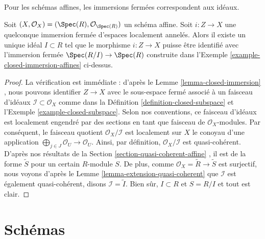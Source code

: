 \begin{lemma}
\label{lemma-closed-immersion-affine-case}
\begin{slogan}
Pour les schémas affines, les immersions fermées correspondent aux idéaux.
\end{slogan}
Soit  $(X, \mathcal{O}_X) = (\Spec(R), \mathcal{O}_{\Spec(R)})$  un schéma affine. Soit  $i : Z \to X$  une quelconque immersion
fermée d'espaces localement annelés. Alors il existe un unique idéal  $I \subset R$ 
tel que le morphisme  $i : Z \to X$  puisse être identifié avec l'immersion fermée
 $\Spec(R/I) \to \Spec(R)$  construite dans l'Exemple  \ref{example-closed-immersion-affines}  ci-dessus.
\end{lemma}

\begin{proof}
La vérification est immédiate : d'après le Lemme  \ref{lemma-closed-immersion} , nous pouvons
identifier  $Z \to X$  avec le sous-espace fermé associé à un faisceau d'idéaux
 $\mathcal{I} \subset \mathcal{O}_X$  comme dans la Définition  \ref{definition-closed-subspace}  et l'Exemple  \ref{example-closed-subspace}.
Selon nos conventions, ce faisceau d'idéaux est localement engendré par des
sections en tant que faisceau de  $\mathcal{O}_X$-modules. Par conséquent, le faisceau
quotient  $\mathcal{O}_X / \mathcal{I}$  est localement sur  $X$  le conoyau d'une application
 $\bigoplus_{j \in J} \mathcal{O}_U \to \mathcal{O}_U$. Ainsi, par définition,  $\mathcal{O}_X / \mathcal{I}$  est quasi-cohérent. D'après nos
résultats de la Section  \ref{section-quasi-coherent-affine} , il est de la forme  $\widetilde S$  pour un
certain  $R$-module  $S$. De plus, comme  $\mathcal{O}_X = \widetilde R \to \widetilde S$  est
surjectif, nous voyons d'après le Lemme  \ref{lemma-extension-quasi-coherent}  que  $\mathcal{I}$ 
est également quasi-cohérent, disons  $\mathcal{I} = \widetilde I$. Bien sûr,  $I \subset R$  et  $S = R/I$  et
tout est clair.
\end{proof}













\section{Schémas}
\label{section-schemes}

